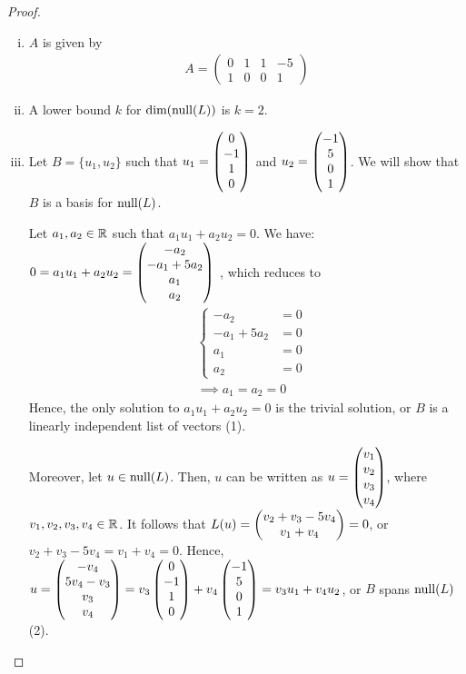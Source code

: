 \begin{proof}
    \renewcommand{\qedsymbol}{$\blacksquare$}
    \begin{enumerate}[(i)]
        \item $A$ is given by 
        \[
            \begin{aligned}
                A = \begin{pmatrix}
                    0 & 1 & 1 & -5\\
                    1 & 0 & 0 & 1
                \end{pmatrix}
            \end{aligned}
        \]
        \item A lower bound $k$ for $\textnormal{dim}(\textnormal{null}(L))$ is $k=2$.
        \item Let $B=\{u_1,u_2\}$ such that $u_1=\begin{pmatrix} 0\\ -1\\1 \\ 0\end{pmatrix}$ and $u_2=\begin{pmatrix} -1\\ 5\\0 \\ 1\end{pmatrix}$.
        We will show that $B$ is a basis for $\textnormal{null}(L)$.
        
        Let $a_1,a_2\in\mathbb R$ such that $a_1u_1+a_2u_2=0$. We have: $0
        = a_1u_1+a_2u_2
        = \begin{pmatrix} -a_2\\ -a_1+5a_2\\a_1 \\ a_2\end{pmatrix}$
        , which reduces to
        \begin{align*}
            &\begin{cases}
                -a_2&=0\\
                -a_1+5a_2&=0\\
                a_1&=0\\
                a_2&=0
            \end{cases}\\&\implies
            a_1=a_2=0
        \end{align*}
        Hence, the only solution to $a_1u_1+a_2u_2=0$ is the trivial solution, or $B$ is a linearly independent list of vectors (1).
        
        Moreover, let $u\in\textnormal{null}(L)$. Then, $u$ can be written as $u=\begin{pmatrix} v_1\\ v_2\\v_3 \\ v_4\end{pmatrix}$, where $v_1,v_2,v_3,v_4\in\mathbb R$.
        It follows that $L(u)=\begin{pmatrix} v_2+v_3-5v_4\\ v_1+v_4\end{pmatrix}=0$, or $v_2+v_3-5v_4=v_1+v_4=0$.
        Hence, $u=\begin{pmatrix} -v_4\\ 5v_4-v_3\\v_3 \\ v_4\end{pmatrix}=v_3 \begin{pmatrix} 0\\ -1\\1 \\ 0\end{pmatrix}+v_4 \begin{pmatrix} -1\\ 5\\0 \\ 1\end{pmatrix}=v_3u_1+v_4u_2$, or $B$ spans $\textnormal{null}(L)$ (2).


\end{enumerate}
\end{proof}
